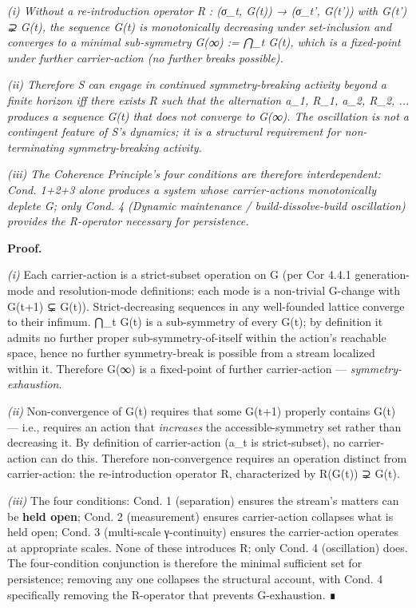 \documentclass[11pt, openany]{book}
\begin{document}
\textit{(i) Without a re-introduction operator R : (σ\_\allowbreak{}t, G(t)) → (σ\_\allowbreak{}t', G(t')) with G(t') ⊋ G(t), the sequence {G(t)} is monotonically decreasing under set-inclusion and converges to a minimal sub-symmetry G(∞) := ⋂\_\allowbreak{}t G(t), which is a fixed-point under further carrier-action (no further breaks possible).}

\textit{(ii) Therefore S can engage in continued symmetry-breaking activity beyond a finite horizon iff there exists R such that the alternation a\_\allowbreak{}1, R\_\allowbreak{}1, a\_\allowbreak{}2, R\_\allowbreak{}2, ... produces a sequence {G(t)} that does not converge to G(∞). The oscillation is not a contingent feature of S's dynamics; it is a structural requirement for non-terminating symmetry-breaking activity.}

\textit{(iii) The Coherence Principle's four conditions are therefore interdependent: Cond. 1+2+3 alone produces a system whose carrier-actions monotonically deplete G; only Cond. 4 (Dynamic maintenance / build-dissolve-build oscillation) provides the R-operator necessary for persistence.}

\textbf{Proof.}

\textit{(i)} Each carrier-action is a strict-subset operation on G (per Cor 4.4.1 generation-mode and resolution-mode definitions: each mode is a non-trivial G-change with G(t+1) ⊊ G(t)). Strict-decreasing sequences in any well-founded lattice converge to their infimum. ⋂\_\allowbreak{}t G(t) is a sub-symmetry of every G(t); by definition it admits no further proper sub-symmetry-of-itself within the action's reachable space, hence no further symmetry-break is possible from a stream localized within it. Therefore G(∞) is a fixed-point of further carrier-action --- \textit{symmetry-exhaustion}.

\textit{(ii)} Non-convergence of {G(t)} requires that some G(t+1) properly contains G(t) --- i.e., requires an action that \textit{increases} the accessible-symmetry set rather than decreasing it. By definition of carrier-action (a\_\allowbreak{}t is strict-subset), no carrier-action can do this. Therefore non-convergence requires an operation distinct from carrier-action: the re-introduction operator R, characterized by R(G(t)) ⊋ G(t).

\textit{(iii)} The four conditions: Cond. 1 (separation) ensures the stream's matters can be \textbf{held open}; Cond. 2 (measurement) ensures carrier-action collapses what is held open; Cond. 3 (multi-scale γ-continuity) ensures the carrier-action operates at appropriate scales. None of these introduces R; only Cond. 4 (oscillation) does. The four-condition conjunction is therefore the minimal sufficient set for persistence; removing any one collapses the structural account, with Cond. 4 specifically removing the R-operator that prevents G-exhaustion. ∎
\end{document}
